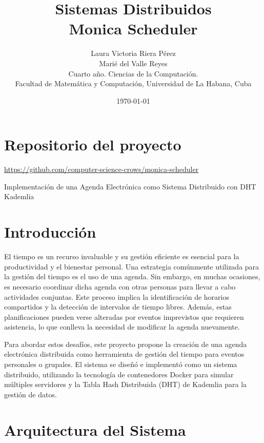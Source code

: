 \documentclass[10pt]{article} %
\title{\normalsize{Sistemas Distribuidos}\\
	\Huge\bfseries Monica Scheduler \\
} %
\author{%
	Laura Victoria Riera P\'erez\\
	Mari\'e del Valle Reyes \vspace{1em} \\
	\small Cuarto a\~no. Ciencias de la Computaci\'on. \\ %
	\small Facultad de Matem\'atica y Computaci\'on, Universidad de La Habana, Cuba \\ %
}
\date{\footnotesize \today } %
\begin{document}
	
	
	
	\maketitle
	
	
	\section*{Repositorio del proyecto}
	
	\begin{center}
		\href{https://github.com/computer-science-crows/monica-scheduler}{https://github.com/computer-science-crows/monica-scheduler}
	\end{center}

	Implementación de una Agenda Electrónica como Sistema Distribuido con DHT Kademlia
	
	\section{Introducción}
	
	El tiempo es un recurso invaluable y su gestión eficiente es esencial para la productividad y el bienestar personal. Una estrategia comúnmente utilizada para la gestión del tiempo es el uso de una agenda. Sin embargo, en muchas ocasiones, es necesario coordinar dicha agenda con otras personas para llevar a cabo actividades conjuntas. Este proceso implica la identificación de horarios compartidos y la detección de intervalos de tiempo libres. Además, estas planificaciones pueden verse alteradas por eventos imprevistos que requieren asistencia, lo que conlleva la necesidad de modificar la agenda nuevamente.
	
	Para abordar estos desafíos, este proyecto propone la creación de una agenda electrónica distribuida como herramienta de gestión del tiempo para eventos personales o grupales. El sistema se diseñó e implementó como un sistema distribuido, utilizando la tecnología de contenedores Docker para simular múltiples servidores y la Tabla Hash Distribuida (DHT) de Kademlia para la gestión de datos.
	
	\section{Arquitectura del Sistema}
	
\end{document}
